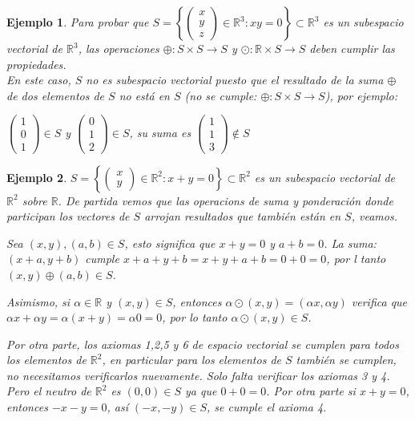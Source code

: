 \documentclass[12pt]{book}
\newtheorem{ejem}{Ejemplo}
\def\R{\mathbb{R}}
\begin{document}
\vspace{0.5 cm}


\begin{ejem} {\em Para probar que $S=\left\{\left(\begin{array}{c}x\\y\\z\end{array}\right)\in\R^3: xy=0\right\}\subset \R^3$ es un subespacio vectorial de $\R^3$, las operaciones $\oplus:S\times S\rightarrow S$ y $\odot:\R\times S\rightarrow S$ deben cumplir las propiedades.\\

En este caso, $S$ no es subespacio vectorial puesto que el resultado de la suma $\oplus$ de dos elementos de $S$ no est\'a en $S$ (no se cumple: $\oplus:S\times S\rightarrow S$), por ejemplo:

\hspace{5 cm}$\left(\begin{array}{c}1\\0\\1\end{array}\right)\in S$  y $\left(\begin{array}{c}0\\1\\2\end{array}\right)\in S$, su suma es $\left(\begin{array}{c}1\\1\\3\end{array}\right)\notin S$\\
}
\end{ejem}

\begin{ejem}{\em $S=\left\{\left(\begin{array}{c}x\\y\end{array}\right)\in\R^2: x+y=0\right\}\subset \R^2$ es un subespacio vectorial de $\R^2$ sobre $\R$.
De partida vemos que las operacions de suma y ponderación donde participan los vectores de $S$ arrojan resultados que también están en $S$, veamos.

Sea $(x,y), (a,b)\in S$, esto significa que $x+y=0$ y $a+b=0$. 
La suma: $(x+a,y+b)$ cumple $x+a+y+b=x+y+a+b=0+0=0$, por l tanto $(x,y)\oplus(a,b)\in S$.

Asimismo, si $\alpha\in\R$ y $(x,y)\in S$, entonces $\alpha\odot(x,y)=(\alpha x, \alpha y)$ verifica que $\alpha x+ \alpha y=\alpha(x+y)=\alpha0=0$, por lo tanto $\alpha\odot(x,y)\in S$.

Por otra parte, los axiomas 1,2,5 y 6 de espacio vectorial se cumplen para todos los elementos de $\R^2$, en particular para los elementos de $S$ también se cumplen, no necesitamos verificarlos nuevamente.
Solo falta verificar los axiomas 3 y 4.
Pero el neutro de $\R^2$ es $(0,0)\in S$ ya que $0+0=0$.
Por otra parte si $x+y=0$, entonces $-x-y=0$, así $(-x,-y)\in S$, se cumple el axioma 4.
}
\end{ejem}
\end{document}
